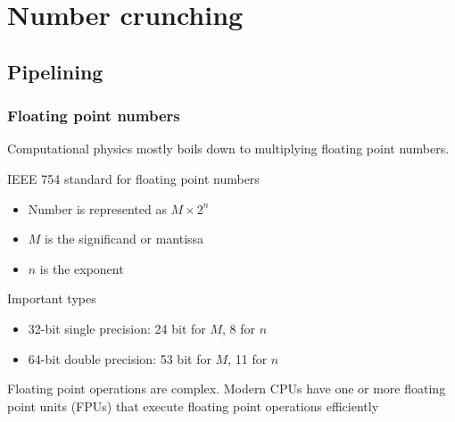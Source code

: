 \documentclass[usenames,dvipsnames,mathserif,compress]{beamer}
\begin{document}
\section*{Number crunching}
\subsection*{Pipelining}

\begin{frame}
  \frametitle{Floating point numbers}
  Computational physics mostly boils down to multiplying floating point numbers.
  \begin{block}{IEEE 754 standard for floating point numbers}
    \begin{itemize}
    \item Number is represented as $M \times 2^n$
    \item $M$ is the significand or mantissa
    \item $n$ is the exponent
    \end{itemize}
  \end{block}
  \begin{block}{Important types}
    \begin{itemize}
    \item 32-bit single precision: 24 bit for $M$, 8 for $n$
    \item 64-bit double precision: 53 bit for $M$, 11 for $n$
    \end{itemize}
  \end{block}
  Floating point operations are complex.
  Modern CPUs have one or more \alert{floating point units} (FPUs)
  that execute floating point operations efficiently
\end{frame}
\end{document}
